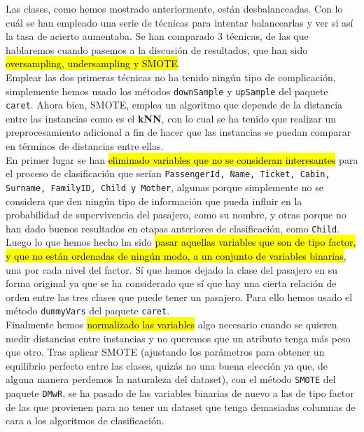 \documentclass[10pt,a4paper]{article}
\newcommand{\emp}[1]{\sethlcolor{light-yellow}\hl{#1}} %
\newcommand{\code}[1]{\textcolor{rblue}{\texttt{#1}}} %
\begin{document}
Las clases, como hemos mostrado anteriormente, están desbalanceadas. Con lo cuál se han empleado una serie de técnicas para intentar balancearlas y ver si así la tasa de acierto aumentaba. Se han comparado 3 técnicas, de las que hablaremos cuando pasemos a la discusión de resultados, que han sido \emp{oversampling, undersampling y SMOTE}.\\

Emplear las dos primeras técnicas no ha tenido ningún tipo de complicación, simplemente hemos usado los métodos \code{downSample} y \code{upSample} del paquete \code{caret}. Ahora bien, SMOTE, emplea un algoritmo que depende de la distancia entre las instancias como es el \textbf{kNN}, con lo cual se ha tenido que realizar un preprocesamiento adicional a fin de hacer que las instancias se puedan comparar en términos de distancias entre ellas.\\

En primer lugar se han \emp{eliminado variables que no se consideran interesantes} para el proceso de clasificación que serían \code{PassengerId, Name, Ticket, Cabin, Surname, FamilyID, Child y Mother}, algunas porque simplemente no se considera que den ningún tipo de información que pueda influir en la probabilidad de supervivencia del pasajero, como su nombre, y otras porque no han dado buenos resultados en etapas anteriores de clasificación, como \code{Child}.\\

Luego lo que hemos hecho ha sido \emp{pasar aquellas variables que son de tipo factor, y que no están ordenadas de ningún modo, a un conjunto de variables binarias}, una por cada nivel del factor. Sí que hemos dejado la clase del pasajero en su forma original ya que se ha considerado que sí que hay una cierta relación de orden entre las tres clases que puede tener un pasajero. Para ello hemos usado el método \code{dummyVars} del paquete \code{caret}.\\

Finalmente hemos \emp{normalizado las variables} algo necesario cuando se quieren medir distancias entre instancias y no queremos que un atributo tenga más peso que otro. Tras aplicar SMOTE (ajustando los parámetros para obtener un equilibrio perfecto entre las clases, quizás no una buena elección ya que, de alguna manera perdemos la naturaleza del dataset), con el método \code{SMOTE} del paquete \code{DMwR}, se ha pasado de las variables binarias de nuevo a las de tipo factor de las que provienen para no tener un dataset que tenga demasiadas columnas de cara a los algoritmos de clasificación.
\end{document}
